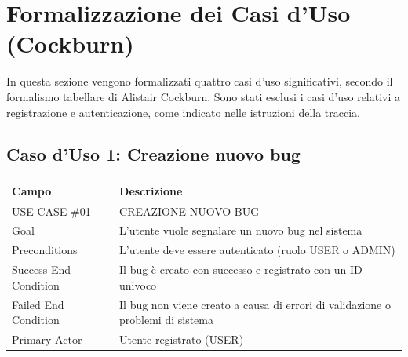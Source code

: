 ﻿\documentclass[a4paper,11pt]{article}
\begin{document}
\section{Formalizzazione dei Casi d'Uso (Cockburn)}

In questa sezione vengono formalizzati quattro casi d'uso significativi, secondo il formalismo tabellare di Alistair Cockburn. Sono stati esclusi i casi d'uso relativi a registrazione e autenticazione, come indicato nelle istruzioni della traccia.

\subsection{Caso d'Uso 1: Creazione nuovo bug}

\begin{tabular}{|p{3cm}|p{11cm}|}
\hline
\textbf{Campo} & \textbf{Descrizione} \\
\hline
USE CASE \#01 & CREAZIONE NUOVO BUG \\
\hline
Goal & L'utente vuole segnalare un nuovo bug nel sistema \\
\hline
Preconditions & L'utente deve essere autenticato (ruolo USER o ADMIN) \\
\hline
Success End Condition & Il bug \`e creato con successo e registrato con un ID univoco \\
\hline
Failed End Condition & Il bug non viene creato a causa di errori di validazione o problemi di sistema \\
\hline
Primary Actor & Utente registrato (USER) \\
\hline
\end{tabular}

\vspace{0.5cm}
\end{document}
